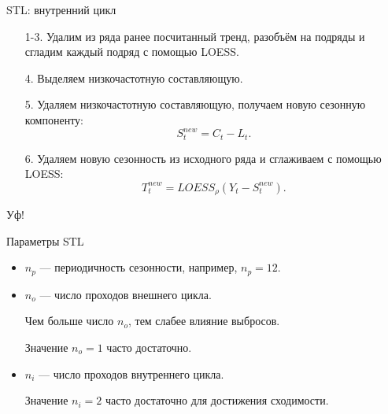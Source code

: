   \begin{frame}{STL: внутренний цикл}
    
    \begin{enumerate}[<+->]
    
      \item[1-3.] Удалим из ряда ранее посчитанный тренд, разобъём на подряды и 
      сгладим каждый подряд с помощью LOESS. 
      
      \item[4.] Выделяем низкочастотную составляющую.
      \item[5.] Удаляем низкочастотную составляющую, получаем \alert{новую} сезонную компоненту:
      \[
      S_t^{new} = C_t - L_t.  
      \]
      \item[6.] Удаляем новую сезонность из исходного ряда и сглаживаем с помощью LOESS:
      \[
      T_t^{new} = LOESS_{\rho}(Y_t - S_t^{new}).
      \]
      
    \end{enumerate}
    
    
    \end{frame}
    
  
    \begin{frame}

      \begin{center}
        Уф!
      \end{center}

    \end{frame}
  

\begin{frame}{Параметры STL}

  \begin{itemize}[<+->]
    \item $n_p$ — периодичность сезонности, например, $n_p=12$.
    \item $n_o$ — число проходов внешнего цикла. 
    
    Чем больше число $n_o$, тем слабее влияние выбросов.

    Значение $n_o = 1$ часто достаточно.
    \item $n_i$ — число проходов внутреннего цикла. 

    Значение $n_i = 2$ часто достаточно для достижения сходимости.
  \end{itemize}
    
\end{frame}


